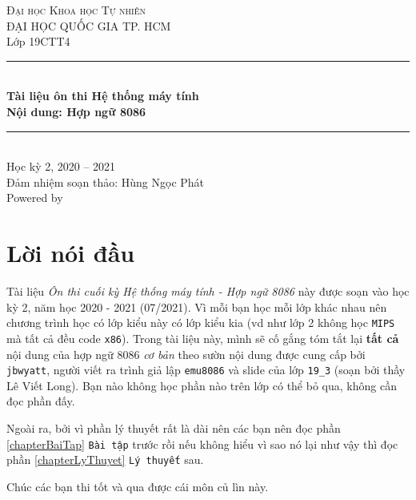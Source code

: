 \documentclass[12pt]{report}
\newcommand{\code}[1]{\texttt{#1}}
\begin{document}
\begin{titlepage}
    \vspace*{\fill}

    \centering
    \textsc{\LARGE Đại học Khoa học Tự nhiên}\\[0.5cm]
    \textsc{\large ĐẠI HỌC QUỐC GIA TP. HCM}\\[0.5cm]
    
    {\Large Lớp 19CTT4}\\[1.5cm]

    \rule{\textwidth}{0.4pt} \\[0.4cm]
    {
        \huge \bfseries Tài liệu ôn thi Hệ thống máy tính\\
        Nội dung: Hợp ngữ 8086
    }
    \rule{\textwidth}{0.4pt}\\[1.5cm]
    
    {\Large Học kỳ 2, 2020 -- 2021}\\[1.5cm]
    {\large Đảm nhiệm soạn thảo: Hùng Ngọc Phát \\
    Powered by \LaTeXe}
    \vspace*{\fill}

\end{titlepage}


\section*{Lời nói đầu}
Tài liệu \textit{Ôn thi cuối kỳ Hệ thống máy tính - Hợp ngữ 8086} này được soạn vào học kỳ 2, năm học 2020 - 2021 (07/2021). Vì mỗi bạn học mỗi lớp khác nhau nên chương trình học có lớp kiểu này có lớp kiểu kia (vd như lớp 2 không học \code{MIPS} mà tất cả đều code \code{x86}). Trong tài liệu này, mình sẽ cố gắng tóm tắt lại \textbf{tất cả} nội dung của hợp ngữ 8086 \textit{cơ bản} theo sườn nội dung được cung cấp bởi \code{jbwyatt}, người viết ra trình giả lập \code{emu8086} và slide của lớp \code{19\_3} (soạn bởi thầy Lê Viết Long). Bạn nào không học phần nào trên lớp có thể bỏ qua, không cần đọc phần đấy.\bigskip

Ngoài ra, bởi vì phần lý thuyết rất là dài nên các bạn nên đọc phần \ref{chapterBaiTap} \code{Bài tập} trước rồi nếu không hiểu vì sao nó lại như vậy thì đọc phần \ref{chapterLyThuyet} \code{Lý thuyết} sau. \bigskip

Chúc các bạn thi tốt và qua được cái môn {\tiny củ lìn} này.\\
\vspace*{\fill}
\end{document}
